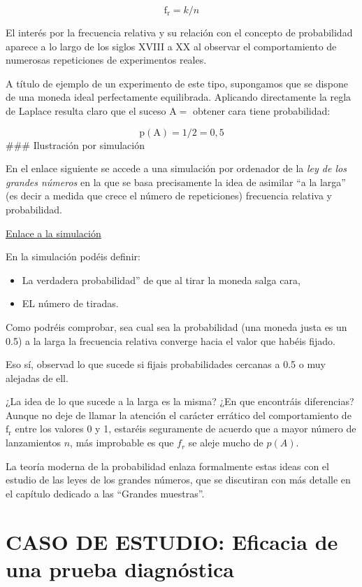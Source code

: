 \documentclass[
  a4paper,
  DIV=11,
  numbers=noendperiod]{scrreprt}
\providecommand{\tightlist}{%
  \setlength{\itemsep}{0pt}\setlength{\parskip}{0pt}}\usepackage{longtable,booktabs,array}
\begin{document}
\[
\mathrm{f}_{\mathrm{r}}=k / n
\]

El interés por la frecuencia relativa y su relación con el concepto de
probabilidad aparece a lo largo de los siglos XVIII a XX al observar el
comportamiento de numerosas repeticiones de experimentos reales.

A título de ejemplo de un experimento de este tipo, supongamos que se
dispone de una moneda ideal perfectamente equilibrada. Aplicando
directamente la regla de Laplace resulta claro que el suceso
\(\mathrm{A}=\) obtener cara tiene probabilidad:

\[
\mathrm{p}(\mathrm{A})=1 / 2=0,5
\] \#\#\# Ilustración por simulación

En el enlace siguiente se accede a una simulación por ordenador de la
\emph{ley de los grandes números} en la que se basa precisamente la idea
de asimilar ``a la larga'' (es decir a medida que crece el número de
repeticiones) frecuencia relativa y probabilidad.

\href{https://www.grbio.eu/statmedia/Statmedia_1/}{Enlace a la
simulación}

En la simulación podéis definir:

\begin{itemize}
\tightlist
\item
  La verdadera probabilidad'' de que al tirar la moneda salga cara,
\item
  EL número de tiradas.
\end{itemize}

Como podréis comprobar, sea cual sea la probabilidad (una moneda justa
es un 0.5) a la larga la frecuencia relativa converge hacia el valor que
habéis fijado.

Eso sí, observad lo que sucede si fijais probabilidades cercanas a 0.5 o
muy alejadas de ell.

¿La idea de lo que sucede a la larga es la misma? ¿En que encontráis
diferencias? Aunque no deje de llamar la atención el carácter errático
del comportamiento de \(\mathrm{f}_{\mathrm{r}}\) entre los valores 0 y
1, estaréis seguramente de acuerdo que a mayor número de lanzamientos
\(n\), más improbable es que \(f_{r}\) se aleje mucho de \(p(A)\).

La teoría moderna de la probabilidad enlaza formalmente estas ideas con
el estudio de las leyes de los grandes números, que se discutiran con
más detalle en el capítulo dedicado a las ``Grandes muestras''.

\section{CASO DE ESTUDIO: Eficacia de una prueba
diagnóstica}\label{caso-de-estudio-eficacia-de-una-prueba-diagnuxf3stica}
\end{document}
